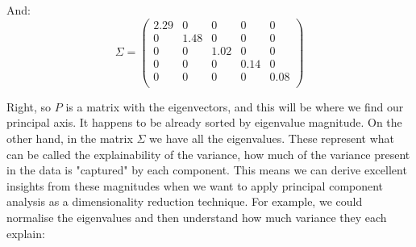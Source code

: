 \documentclass[a4,12pt,twosided,openany]{memoir}
\begin{document}
\par 
\indent
And:
\[
\Sigma = 
\begin{pmatrix}
  2.29 & 0 & 0 & 0 & 0\\
  0 & 1.48 & 0 & 0 & 0\\
  0 & 0 & 1.02 & 0 & 0 \\
  0 & 0 & 0 & 0.14 & 0\\ 
  0 & 0 & 0 & 0 & 0.08\\ 
\end{pmatrix} \]
\par 
\indent
Right, so $P$ is a matrix with the eigenvectors, and this will be where we find our principal axis. It happens to be already sorted by eigenvalue magnitude. On the other hand, in the matrix $\Sigma$ we have all the eigenvalues. These represent what can be called the explainability of the variance, how much of the variance present in the data is "captured" by each component. This means we can derive excellent insights from these magnitudes when we want to apply principal component analysis as a dimensionality reduction technique. For example, we could normalise the eigenvalues and then understand how much variance they each explain:
\end{document}
